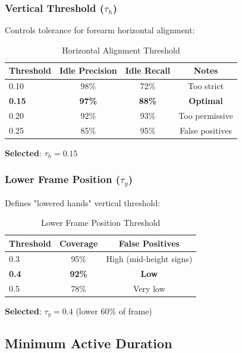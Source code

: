 \documentclass[11pt,a4paper]{article}
\begin{document}
\subsubsection{Vertical Threshold ($\tau_h$)}

Controls tolerance for forearm horizontal alignment:

\begin{table}[htbp]
\centering
\caption{Horizontal Alignment Threshold}
\begin{tabular}{@{}lccc@{}}
\toprule
\textbf{Threshold} & \textbf{Idle Precision} & \textbf{Idle Recall} & \textbf{Notes} \\ \midrule
0.10 & 98\% & 72\% & Too strict \\
\textbf{0.15} & \textbf{97\%} & \textbf{88\%} & \textbf{Optimal} \\
0.20 & 92\% & 93\% & Too permissive \\
0.25 & 85\% & 95\% & False positives \\
\bottomrule
\end{tabular}
\end{table}

\textbf{Selected}: $\tau_h = 0.15$

\subsubsection{Lower Frame Position ($\tau_y$)}

Defines "lowered hands" vertical threshold:

\begin{table}[htbp]
\centering
\caption{Lower Frame Position Threshold}
\begin{tabular}{@{}lcc@{}}
\toprule
\textbf{Threshold} & \textbf{Coverage} & \textbf{False Positives} \\ \midrule
0.3 & 95\% & High (mid-height signs) \\
\textbf{0.4} & \textbf{92\%} & \textbf{Low} \\
0.5 & 78\% & Very low \\
\bottomrule
\end{tabular}
\end{table}

\textbf{Selected}: $\tau_y = 0.4$ (lower 60\% of frame)

\subsection{Minimum Active Duration}
\end{document}
